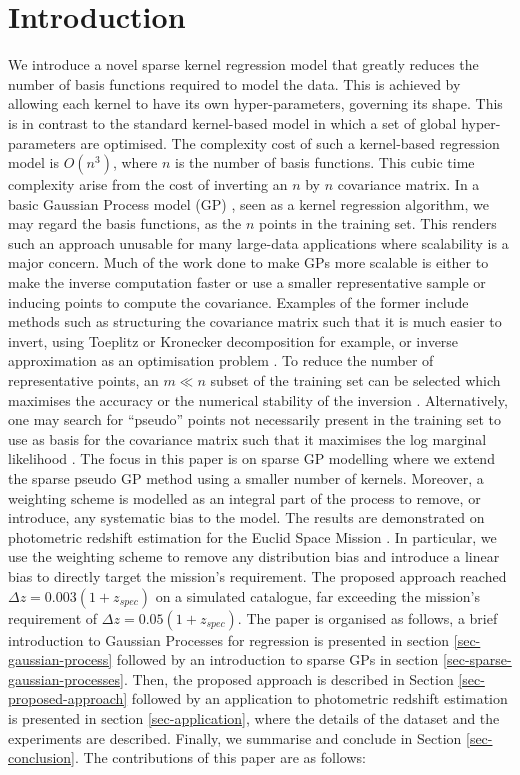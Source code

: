 \documentclass[useAMS,usenatbib,fleqn]{mn2e}
\begin{document}
\section{Introduction}
We introduce a novel sparse kernel regression model that greatly reduces the number of basis functions required to model the data. This is achieved by allowing each kernel to have its own hyper-parameters, governing its shape. This is in contrast to the standard kernel-based model in which a set of global hyper-parameters are optimised. The complexity cost of such a kernel-based regression model is $O\left(n^{3}\right)$, where $n$ is the number of basis functions. This cubic time complexity arise from the cost of inverting an $n$ by $n$ covariance matrix. In a basic Gaussian Process model (GP) \citep{rasmussen2006gaussian}, seen as a kernel regression algorithm, we may regard the basis functions, as the $n$ points in the training set. This renders such an approach unusable for many large-data applications where scalability is a major concern. Much of the work done to make GPs more scalable is either to make the inverse computation faster or use a smaller representative sample or inducing points to compute the covariance. Examples of the former include methods such as structuring the covariance matrix such that it is much easier to invert, using Toeplitz  \citep{zhang2005time} or Kronecker decomposition \citep{tsiligkaridis2013} for example, or inverse approximation as an optimisation problem \citep{gibbs97}. To reduce the number of representative points, an $m \ll n$ subset of the training set can be selected which maximises the accuracy or the numerical stability of the inversion \citep{foster2009}. Alternatively, one may search for ``pseudo'' points not necessarily present in the training set to use as basis for the covariance matrix such that it maximises the log marginal likelihood \citep{snelson2005}. The focus in this paper is on sparse GP modelling where we extend the sparse pseudo GP method using a smaller number of kernels. Moreover, a weighting scheme is modelled as an integral part of the process to remove, or introduce, any systematic bias to the model. The results are demonstrated on photometric redshift estimation for the Euclid Space Mission \citep{laureijs2011}. In particular, we use the weighting scheme to remove any distribution bias and introduce a linear bias to directly target the mission's requirement. The proposed approach reached $\Delta z = 0.003(1+z_{spec})$ on a simulated catalogue, far exceeding the mission's requirement of $\Delta z = 0.05(1+z_{spec})$. The paper is organised as follows, a brief introduction to Gaussian Processes for regression is presented in section \ref{sec-gaussian-process} followed by an introduction to sparse GPs in section \ref{sec-sparse-gaussian-processes}. Then, the proposed approach is described in Section \ref{sec-proposed-approach} followed by an application to photometric redshift estimation is presented in section \ref{sec-application}, where the details of the dataset and the experiments are described. Finally, we summarise and conclude in Section \ref{sec-conclusion}. The contributions of this paper are as follows:
\end{document}
